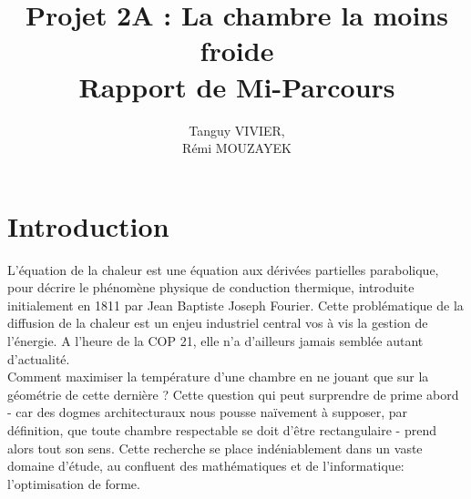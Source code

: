 \documentclass[a4paper,reqno]{article}
\begin{document}
\title{Projet 2A : La chambre la moins froide \\ Rapport de Mi-Parcours}
\author{Tanguy VIVIER, \\
Rémi MOUZAYEK}
\maketitle
\newpage

\setlength{\parindent}{1cm}
\part*{Introduction}
L'équation de la chaleur est une équation aux dérivées partielles 
parabolique, pour décrire le phénomène physique de conduction thermique, introduite initialement en 1811 par Jean Baptiste Joseph Fourier. Cette problématique de la diffusion de la chaleur est un enjeu industriel central vos à vis la gestion de l'énergie. A l'heure de la COP 21, elle n'a d'ailleurs jamais semblée autant d'actualité. \\
Comment maximiser la température d'une chambre en ne jouant que sur la géométrie de cette dernière ? Cette question qui peut surprendre de prime abord - car des dogmes architecturaux nous pousse naïvement à supposer, par définition, que toute chambre respectable se doit d'être rectangulaire - prend alors tout son sens.
Cette recherche se place indéniablement dans un vaste domaine d'étude, au confluent des mathématiques et de l'informatique: l'optimisation de forme. \\


\end{document}
